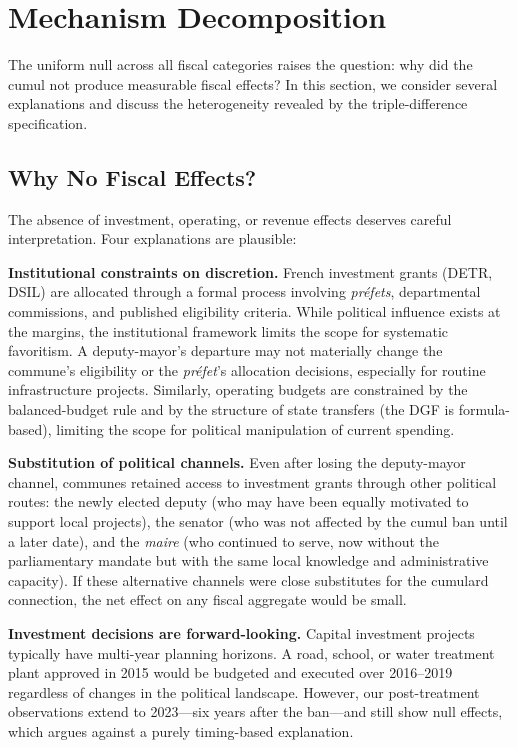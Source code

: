 \documentclass[12pt]{article}
\begin{document}
\section{Mechanism Decomposition}\label{sec:mechanisms}

The uniform null across all fiscal categories raises the question: why did the cumul not produce measurable fiscal effects? In this section, we consider several explanations and discuss the heterogeneity revealed by the triple-difference specification.

\subsection{Why No Fiscal Effects?}

The absence of investment, operating, or revenue effects deserves careful interpretation. Four explanations are plausible:

\textbf{Institutional constraints on discretion.} French investment grants (DETR, DSIL) are allocated through a formal process involving \textit{préfets}, departmental commissions, and published eligibility criteria. While political influence exists at the margins, the institutional framework limits the scope for systematic favoritism. A deputy-mayor's departure may not materially change the commune's eligibility or the \textit{préfet}'s allocation decisions, especially for routine infrastructure projects. Similarly, operating budgets are constrained by the balanced-budget rule and by the structure of state transfers (the DGF is formula-based), limiting the scope for political manipulation of current spending.

\textbf{Substitution of political channels.} Even after losing the deputy-mayor channel, communes retained access to investment grants through other political routes: the newly elected deputy (who may have been equally motivated to support local projects), the senator (who was not affected by the cumul ban until a later date), and the \textit{maire} (who continued to serve, now without the parliamentary mandate but with the same local knowledge and administrative capacity). If these alternative channels were close substitutes for the cumulard connection, the net effect on any fiscal aggregate would be small.

\textbf{Investment decisions are forward-looking.} Capital investment projects typically have multi-year planning horizons. A road, school, or water treatment plant approved in 2015 would be budgeted and executed over 2016--2019 regardless of changes in the political landscape. However, our post-treatment observations extend to 2023---six years after the ban---and still show null effects, which argues against a purely timing-based explanation.
\end{document}
